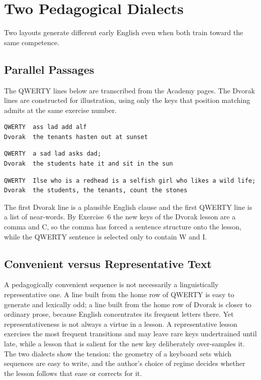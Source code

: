 \chapter{Two Pedagogical Dialects}

Two layouts generate different early English even when both train toward the same competence.

\section{Parallel Passages}

The QWERTY lines below are transcribed from the Academy pages. The Dvorak lines are constructed for illustration, using only the keys that position matching admits at the same exercise number.

\begin{Verbatim}[label=Exercise 1, labelposition=topline]
QWERTY  ass lad add alf
Dvorak  the tenants hasten out at sunset
\end{Verbatim}

\begin{Verbatim}[label=Exercise 2, labelposition=topline]
QWERTY  a sad lad asks dad;
Dvorak  the students hate it and sit in the sun
\end{Verbatim}

\begin{Verbatim}[label=Exercise 6, labelposition=topline]
QWERTY  Ilse who is a redhead is a selfish girl who likes a wild life;
Dvorak  the students, the tenants, count the stones
\end{Verbatim}

The first Dvorak line is a plausible English clause and the first QWERTY line is a list of near-words. By Exercise~6 the new keys of the Dvorak lesson are a comma and C, so the comma has forced a sentence structure onto the lesson, while the QWERTY sentence is selected only to contain W and I.

\section{Convenient versus Representative Text}

A pedagogically convenient sequence is not necessarily a linguistically representative one. A line built from the home row of QWERTY is easy to generate and lexically odd; a line built from the home row of Dvorak is closer to ordinary prose, because English concentrates its frequent letters there. Yet representativeness is not always a virtue in a lesson. A representative lesson exercises the most frequent transitions and may leave rare keys undertrained until late, while a lesson that is salient for the new key deliberately over-samples it. The two dialects show the tension: the geometry of a keyboard sets which sequences are easy to write, and the author's choice of regime decides whether the lesson follows that ease or corrects for it.

